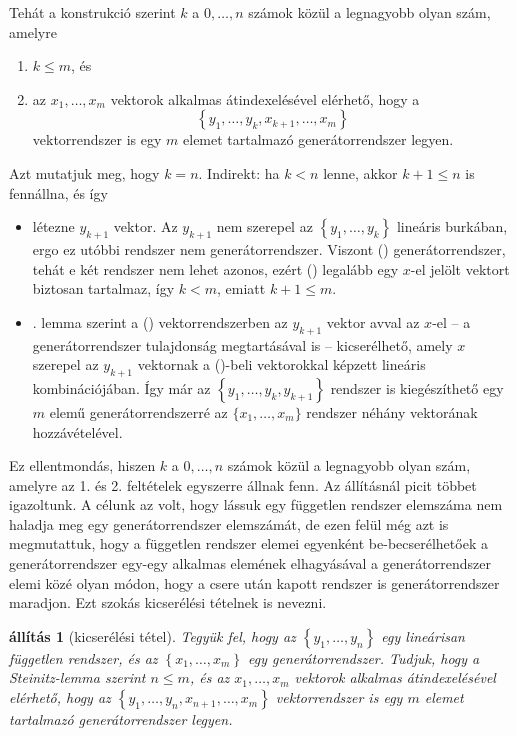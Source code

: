 \documentclass[a4paper, showtrims]{memoir}
\makeatletter
\renewenvironment{proof}[1][\proofname]
    {\par\pushQED{\qed}%
    \normalfont \topsep6\p@\@plus6\p@\relax
    \trivlist
    \item[\hskip\labelsep
        \itshape
    #1\@addpunct{:}]\ignorespaces}
    {\popQED\endtrivlist\@endpefalse}
\theoremstyle{plain}
\newtheorem{proposition}{állítás}[chapter]
\theoremstyle{remark}
\theoremstyle{definition}
\makeatother
\begin{document}
\begin{proof}
    Tehát a konstrukció szerint $k$ a $0,\ldots,n$ számok közül a legnagyobb olyan szám, amelyre
	\begin{enumerate}
		\item $k\leq m$, és
		\item az $x_1,\ldots,x_m$ vektorok alkalmas átindexelésével elérhető, hogy a
		      \[
			      \left\{ y_1,\ldots,y_k,x_{k+1},\ldots,x_m \right\}\tag{\dag}
		      \]
		      vektorrendszer is egy $m$ elemet tartalmazó generátorrendszer legyen.
	\end{enumerate}
	Azt mutatjuk meg, hogy $k=n$. 
	Indirekt: ha $k<n$ lenne, akkor $k+1\leq n$ is fennállna, és így
	\begin{itemize}
		\item
		      létezne $y_{k+1}$ vektor.
		      Az $y_{k+1}$ nem szerepel az $\left\{ y_1,\ldots,y_k \right\}$ lineáris burkában, 
              ergo ez utóbbi rendszer nem generátorrendszer.
		      Viszont (\dag) generátorrendszer, tehát e két rendszer nem lehet azonos, ezért (\dag)
              legalább egy $x$-el jelölt vektort biztosan tartalmaz, 
              így $k<m$, emiatt $k+1\leq m$.
		\item
            . lemma szerint a (\dag) vektorrendszerben az $y_{k+1}$ vektor
		      avval az $x$-el
		      -- a generátorrendszer tulajdonság megtartásával is --
		      kicserélhető,
		      amely $x$ szerepel az $y_{k+1}$ vektornak a (\dag)-beli
		      vektorokkal képzett lineáris kombinációjában.
              Így már az $\left\{ y_1,\ldots,y_k,y_{k+1} \right\}$ rendszer is kiegészíthető egy $m$ elemű generátorrendszerré az $\{x_1,\ldots,x_m\}$ rendszer néhány vektorának hozzávételével.
	\end{itemize}
	Ez ellentmondás, hiszen $k$ a $0,\ldots,n$ számok közül a legnagyobb olyan szám,
	amelyre az 1. és 2. feltételek egyszerre állnak fenn.
\end{proof}
Az állításnál picit többet igazoltunk. 
A célunk az volt, hogy lássuk egy független rendszer elemszáma nem haladja meg egy generátorrendszer elemszámát, de ezen felül még azt is megmutattuk,
hogy a független rendszer elemei egyenként be-becserélhetőek a generátorrendszer 
egy-egy alkalmas elemének elhagyásával a generátorrendszer elemi közé olyan módon, 
hogy a csere után kapott rendszer is generátorrendszer maradjon.
Ezt szokás kicserélési tételnek is nevezni.
\begin{proposition}[kicserélési tétel]\label{pr:kicserelesi}
	Tegyük fel, hogy az $\left\{ y_1,\ldots,y_n \right\}$ egy lineárisan független rendszer,
	és az
	$\left\{ x_1,\ldots,x_m \right\}$ egy generátorrendszer.
    Tudjuk, hogy a Steinitz-lemma szerint $n\leq m$, és
    az $x_1,\ldots,x_m$ vektorok alkalmas átindexelésével elérhető, hogy az
    \(
        \left\{ y_1,\ldots,y_n,x_{n+1},\ldots,x_m \right\}
    \)
    vektorrendszer is egy $m$ elemet tartalmazó generátorrendszer legyen.
\end{proposition}
\end{document}
